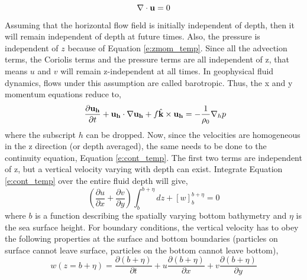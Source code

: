 \begin{equation}\label{e:cont_temp}
    \nabla \cdot {\bf u} = 0
\end{equation}
%
Assuming that the horizontal flow field is initially independent of depth, then it will remain independent of depth at future times.  Also, the pressure is independent of $z$ because of Equation \ref{e:zmom_temp}.  Since all the advection terms, the Coriolis terms and the pressure terms are all independent of z, that means $u$ and $v$ will remain z-independent at all times.  In geophysical fluid dynamics, flows under this assumption are called barotropic.   Thus, the x and y momentum equations reduce to, 
%
\begin{equation}\label{e:mom_temp1}
    \ \frac{\partial {\bf u_h}}{\partial t} + {\bf u_h} \cdot \nabla {\bf u_h}   + f  \hat{\bf k} \times {\bf u_h}= - \frac{1}{\rho_0} \nabla_h p 
\end{equation}
%
where the subscript $h$ can be dropped.  Now, since the velocities are homogeneous in the z direction (or depth averaged), the same needs to be done to the continuity equation, Equation \ref{e:cont_temp}.  The first two terms are independent of z, but a vertical velocity varying with depth can exist.  Integrate Equation \ref{e:cont_temp} over the entire fluid depth will give, 
%
\begin{equation}\label{e:integ_cont}
    (\frac{\partial u}{\partial x} + \frac{\partial v}{\partial y}) \int^{b+\eta}_{b} dz + [w]_{b}^{b+\eta} = 0
\end{equation}
%
where $b$ is a function describing the spatially varying bottom bathymetry and $\eta$ is the sea surface height.  For boundary conditions, the vertical velocity has to obey the following properties at the surface and bottom boundaries (particles on surface cannot leave surface, particles on the bottom cannot leave bottom), 
%
\begin{equation*}
    w(z=b+\eta) = \frac{\partial (b + \eta)}{\partial t} + u \frac{\partial (b+ \eta)}{\partial x} + v \frac{\partial (b+\eta)}{\partial y}
\end{equation*}

